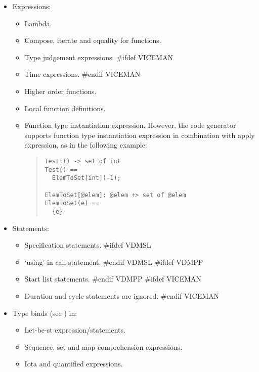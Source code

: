 \documentclass[\pformat,11pt]{article}
\newcommand{\langmancite}{\cite{LangManPP-CSK}}
\newcommand{\VDM}{VDM++}
\begin{document}
\begin{itemize}

\item Expressions:

  \begin{itemize}
  \item Lambda.
  \item Compose,  iterate and equality for functions.
  \item Type judgement expressions.
#ifdef VICEMAN
  \item Time expressions.
#endif VICEMAN
  \item Higher order functions.
  \item Local function definitions.
  \item Function type instantiation expression. However, the code
    generator supports function type instantiation expression in
    combination with apply expression, as in the following example:

\begin{quote}
\begin{verbatim}
Test:() -> set of int
Test() ==
  ElemToSet[int](-1);

ElemToSet[@elem]: @elem +> set of @elem
ElemToSet(e) ==
  {e}
\end{verbatim}
\end{quote}

  \end{itemize}

\item Statements: 

  \begin{itemize}
  \item Specification statements.
#ifdef VDMSL
  \item `{\sf using}' in call statement.
#endif VDMSL
#ifdef VDMPP
  \item Start list statements.
#endif VDMPP
#ifdef VICEMAN
  \item Duration and cycle statements are ignored.
#endif VICEMAN
  \end{itemize}

\item Type binds (see \langmancite) in:

  \begin{itemize}
  \item Let-be-st expression/statements.
  \item Sequence, set and map comprehension expressions.
  \item Iota and quantified expressions.
  \end{itemize}


\end{itemize}
\end{document}
